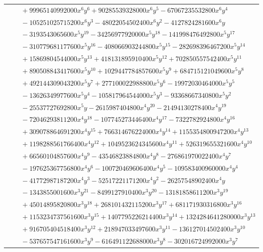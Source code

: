 \documentclass[11pt]{article}
\begin{document}
\begin{longtable}{@{}ll@{}}
 & $\quad +99965140992000x^{6}y^{6}+90285539328000x^{6}y^{5}-67067235532800x^{6}y^{4}$\\
 & $\quad -105251025715200x^{6}y^{3}-48022054502400x^{6}y^{2}-4127824281600x^{6}y$\\
 & $\quad -3193543065600x^{5}y^{19}-34256977920000x^{5}y^{18}-141998476492800x^{5}y^{17}$\\
 & $\quad -310779681177600x^{5}y^{16}-408066903244800x^{5}y^{15}-282698396467200x^{5}y^{14}$\\
 & $\quad +15869804544000x^{5}y^{13}+418131895910400x^{5}y^{12}+702850557542400x^{5}y^{11}$\\
 & $\quad +890508843417600x^{5}y^{10}+1029447784857600x^{5}y^{9}+684715121049600x^{5}y^{8}$\\
 & $\quad +492144309043200x^{5}y^{7}+277100022988800x^{5}y^{6}-19972030464000x^{5}y^{5}$\\
 & $\quad -13626349977600x^{5}y^{4}-105817964544000x^{5}y^{3}-93368667340800x^{5}y^{2}$\\
 & $\quad -25537727692800x^{5}y-2615987404800x^{4}y^{20}-21494130278400x^{4}y^{19}$\\
 & $\quad -72046293811200x^{4}y^{18}-107745273446400x^{4}y^{17}-7322782924800x^{4}y^{16}$\\
 & $\quad +309078864691200x^{4}y^{15}+766314676224000x^{4}y^{14}+1155354800947200x^{4}y^{13}$\\
 & $\quad +1198288561766400x^{4}y^{12}+1049523624345600x^{4}y^{11}+526319655321600x^{4}y^{10}$\\
 & $\quad +66560104857600x^{4}y^{9}-43546823884800x^{4}y^{8}-276861970022400x^{4}y^{7}$\\
 & $\quad -197625367756800x^{4}y^{6}-100720469606400x^{4}y^{5}-109583400960000x^{4}y^{4}$\\
 & $\quad -41772987187200x^{4}y^{3}-52517221171200x^{4}y^{2}-26257548902400x^{4}y$\\
 & $\quad -1343855001600x^{3}y^{21}-8499127910400x^{3}y^{20}-13181858611200x^{3}y^{19}$\\
 & $\quad +45014895820800x^{3}y^{18}+268101432115200x^{3}y^{17}+681171930316800x^{3}y^{16}$\\
 & $\quad +1153234737561600x^{3}y^{15}+1407795226214400x^{3}y^{14}+1324284641280000x^{3}y^{13}$\\
 & $\quad +916705404518400x^{3}y^{12}+218947033497600x^{3}y^{11}-136127014502400x^{3}y^{10}$\\
 & $\quad -537657547161600x^{3}y^{9}-616491122688000x^{3}y^{8}-302016724992000x^{3}y^{7}$\\

\end{longtable}
\end{document}
